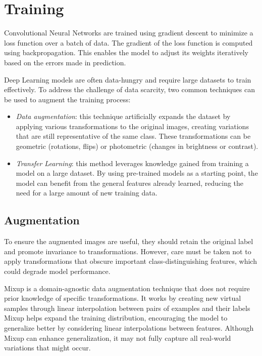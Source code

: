\section{Training}

Convolutional Neural Networks are trained using gradient descent to minimize a loss function over a batch of data.
The gradient of the loss function is computed using backpropagation. 
This enables the model to adjust its weights iteratively based on the errors made in prediction.

Deep Learning models are often data-hungry and require large datasets to train effectively. 
To address the challenge of data scarcity, two common techniques can be used to augment the training process:
\begin{itemize} 
    \item \textit{Data augmentation}: this technique artificially expands the dataset by applying various transformations to the original images, creating variations that are still representative of the same class. 
        These transformations can be geometric (rotations, flips) or photometric (changes in brightness or contrast).
    \item \textit{Transfer Learning}: this method leverages knowledge gained from training a model on a large dataset. 
        By using pre-trained models as a starting point, the model can benefit from the general features already learned, reducing the need for a large amount of new training data.
\end{itemize} 

\subsection{Augmentation}
To ensure the augmented images are useful, they should retain the original label and promote invariance to transformations. 
However, care must be taken not to apply transformations that obscure important class-distinguishing features, which could degrade model performance.

Mixup is a domain-agnostic data augmentation technique that does not require prior knowledge of specific transformations. 
It works by creating new virtual samples through linear interpolation between pairs of examples and their labels
Mixup helps expand the training distribution, encouraging the model to generalize better by considering linear interpolations between features. 
Although Mixup can enhance generalization, it may not fully capture all real-world variations that might occur.

